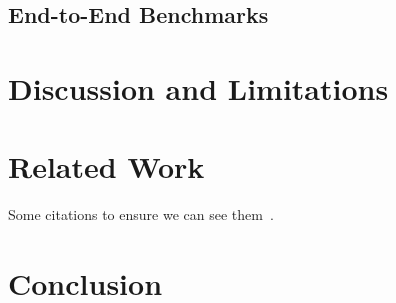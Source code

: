 \documentclass[letterpaper,twocolumn,10pt]{article}
\begin{document}
\subsection{End-to-End Benchmarks}
\label{macro}

\section{Discussion and Limitations}
\label{diss}

\section{Related Work}
\label{rw}
Some citations to ensure we can see them~\cite{Christophe:2015:DAU:2819009.2819180, Keil:2013:EDA:2508168.2508176, Lehmann:2019:WFD:3297858.3304068, Sun:2018:EDA:3178372.3179527}.

\section{Conclusion}
\label{end}

% 



\end{document}
